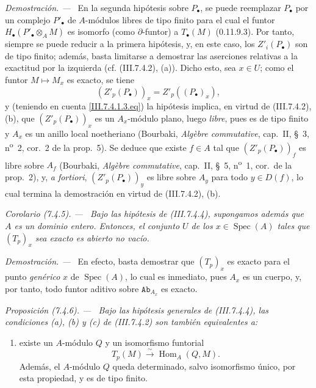 \documentclass[10pt,oneside]{book}
\newcommand{\cat}[1]{\mathtt{#1}}
\newcommand{\Spec}{\operatorname{Spec}}
\newcommand{\Hom}{\operatorname{Hom}}
\newcommand{\sref}[2][]{\textup{(#2)}}
\newcommand{\oldpage}[2][]{\setcounter{footnote}{0}\marginpar{\scriptsize\textbf{#1}~|~#2}\ignorespaces}
\newenvironment{proposition}[1][]{\par\medskip\noindent\itshape Proposición (#1). ---\ }{\par}
\newenvironment{corollary}[1][]{\par\medskip\noindent\itshape Corolario (#1). ---\ }{\par}
\newenvironment{proof}{\par\medskip\noindent\textit{Demostración. ---\ }}{\par}
\begin{document}
\begin{proof}
En la segunda hipótesis sobre $P_\bullet$, se puede reemplazar $P_\bullet$ por
un complejo $P'_\bullet$ de
\oldpage[III]{188}
$A$-módulos libres de tipo finito para el cual el funtor
$H_\bullet(P'_\bullet\otimes_A M)$ es isomorfo (como $\partial$-funtor) a
$T_\bullet(M)$ \sref[0]{0.11.9.3}. Por tanto, siempre se puede reducir a la
primera hipótesis, y, en este caso, los $Z'_i(P_\bullet)$ son de tipo finito;
además, basta limitarse a demostrar las aserciones relativas a la exactitud por
la izquierda (cf. \sref{III.7.4.2}, (a)). Dicho esto, sea $x\in U$; como el
funtor $M\mapsto M_x$ es exacto, se tiene
\[
  (Z'_p(P_\bullet))_x=Z'_p((P_\bullet)_x),
\]
y (teniendo en cuenta \eqref{III.7.4.1.3.eq}) la hipótesis implica, en virtud
de \sref{III.7.4.2}, (b), que $(Z'_p(P_\bullet))_x$ es un $A_x$-módulo plano,
luego \emph{libre}, pues es de tipo finito y $A_x$ es un anillo local noetheriano
(Bourbaki, \emph{Algèbre commutative}, cap.~II, \S~3,
n\textsuperscript{o}~2, cor.~2 de la prop.~5). Se deduce que existe $f\in A$
tal que $(Z'_p(P_\bullet))_f$ es libre sobre $A_f$ (Bourbaki,
\emph{Algèbre commutative}, cap.~II, \S~5, n\textsuperscript{o}~1, cor.~de la
prop.~2), y, \emph{a fortiori}, $(Z'_p(P_\bullet))_y$ es libre sobre $A_y$ para
todo $y\in D(f)$, lo cual termina la demostración en virtud de
\sref{III.7.4.2}, (b).
\end{proof}

\begin{corollary}[7.4.5]
\label{III.7.4.5}
Bajo las hipótesis de \sref{III.7.4.4}, supongamos además que $A$ es un
dominio entero.
Entonces, el conjunto $U$ de los $x\in\Spec(A)$ tales que $(T_p)_x$ sea
exacto es abierto no vacío.
\end{corollary}

\begin{proof}
En efecto, basta demostrar que $(T_p)_x$ es exacto para el punto \emph{genérico} $x$
de $\Spec(A)$, lo cual es inmediato, pues $A_x$ es un cuerpo, y, por tanto,
todo funtor aditivo sobre $\cat{Ab}_{A_x}$ es exacto.
\end{proof}

\begin{proposition}[7.4.6]
\label{III.7.4.6}
Bajo las hipótesis generales de \sref{III.7.4.4}, las condiciones (a), (b) y
(c) \textup{de \sref{III.7.4.2}} son también equivalentes a:
\begin{enumerate}
  \item[(d)] existe un $A$-módulo $Q$ y un isomorfismo funtorial
    \[
      T_p(M)\xrightarrow{\sim}\Hom_A(Q,M).
      \tag{7.4.6.1}\label{III.7.4.6.1.eq}
    \]
    Además, el $A$-módulo $Q$ queda determinado, salvo isomorfismo único, por
    esta propiedad, y es de tipo finito.
\end{enumerate}
\end{proposition}
\end{document}
